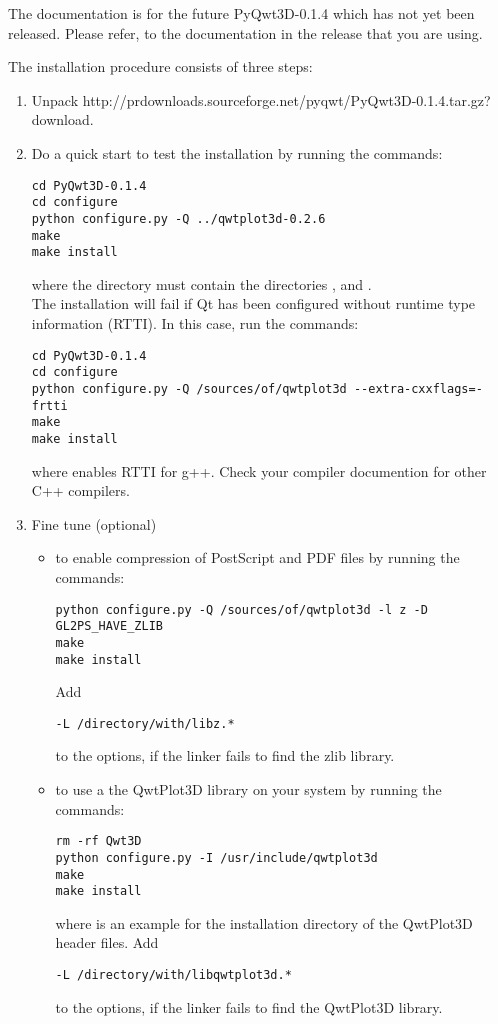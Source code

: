 \documentclass{manual}
\newcommand{\PyQwtDddTarGz}{\ulink{PyQwt3D-0.1.4.tar.gz}
  {http://prdownloads.sourceforge.net/pyqwt/PyQwt3D-0.1.4.tar.gz?download}}
\newcommand{\Future}{
  \begin{notice}[warning]
    The documentation is for the future PyQwt3D-0.1.4 which has not yet been
    released.  Please refer, to the documentation in the release that you are
    using.
  \end{notice}
}
\begin{document}
\Future{}

The installation procedure consists of three steps:
\begin{enumerate}
\item
  Unpack \PyQwtDddTarGz{}.
\item
  Do a quick start to test the installation by running the commands:
\begin{verbatim}
cd PyQwt3D-0.1.4
cd configure
python configure.py -Q ../qwtplot3d-0.2.6
make
make install
\end{verbatim}
  where the directory
   must contain the directories ,
   and .\\
  The installation will fail if Qt has been configured without runtime type
  information (RTTI).  In this case, run the commands:
\begin{verbatim}
cd PyQwt3D-0.1.4
cd configure
python configure.py -Q /sources/of/qwtplot3d --extra-cxxflags=-frtti
make
make install
\end{verbatim}
  where  enables RTTI for g++.  Check your compiler documention
  for other C++ compilers.
\item
  Fine tune (optional)
  \begin{itemize}
    \item
      to enable compression of PostScript and PDF files by running the
      commands:
\begin{verbatim}
python configure.py -Q /sources/of/qwtplot3d -l z -D GL2PS_HAVE_ZLIB
make
make install
\end{verbatim}
      Add
\begin{verbatim}
-L /directory/with/libz.*
\end{verbatim}
      to the  options, if the linker fails to find the zlib
      library.
    \item
      to use a the QwtPlot3D library on your system by running the commands:
\begin{verbatim}
rm -rf Qwt3D
python configure.py -I /usr/include/qwtplot3d
make
make install
\end{verbatim}
      where  is an example for the installation
      directory of the QwtPlot3D header files.
      Add
\begin{verbatim}
-L /directory/with/libqwtplot3d.*
\end{verbatim}
      to the  options, if the linker fails to find the
      QwtPlot3D library.
  \end{itemize}
\end{enumerate}
\end{document}
